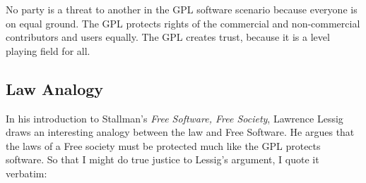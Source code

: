 \documentclass[12pt]{report}
\begin{document}
No party is a threat to another in the GPL software scenario because
everyone is on equal ground.  The GPL protects rights of the commercial
and non-commercial contributors and users equally.  The GPL creates trust,
because it is a level playing field for all.

\subsection{Law Analogy}

In his introduction to Stallman's \emph{Free Software, Free Society},
Lawrence Lessig draws an interesting analogy between the law and Free
Software.  He argues that the laws of a Free society must be protected
much like the GPL protects software.  So that I might do true justice to
Lessig's argument, I quote it verbatim:
\end{document}
